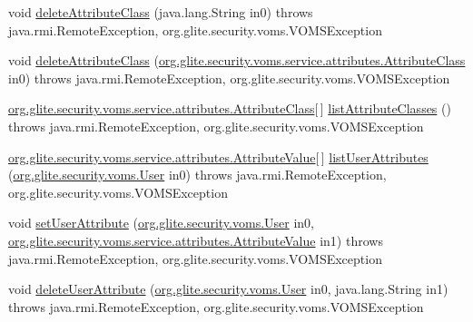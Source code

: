 \begin{DoxyCompactItemize}
\item 
void \hyperlink{classorg_1_1glite_1_1security_1_1voms_1_1service_1_1attributes_1_1VOMSAttributesSoapBindingSkeleton_a7e2d03eb60af98e7e7f45896181dac96}{deleteAttributeClass} (java.lang.String in0)  throws java.rmi.RemoteException, org.glite.security.voms.VOMSException     
\item 
void \hyperlink{classorg_1_1glite_1_1security_1_1voms_1_1service_1_1attributes_1_1VOMSAttributesSoapBindingSkeleton_ac16139dce71cf10dcaf56b9671cf9e37}{deleteAttributeClass} (\hyperlink{classorg_1_1glite_1_1security_1_1voms_1_1service_1_1attributes_1_1AttributeClass}{org.glite.security.voms.service.attributes.AttributeClass} in0)  throws java.rmi.RemoteException, org.glite.security.voms.VOMSException     
\item 
\hyperlink{classorg_1_1glite_1_1security_1_1voms_1_1service_1_1attributes_1_1AttributeClass}{org.glite.security.voms.service.attributes.AttributeClass}\mbox{[}$\,$\mbox{]} \hyperlink{classorg_1_1glite_1_1security_1_1voms_1_1service_1_1attributes_1_1VOMSAttributesSoapBindingSkeleton_a3e032fc86cd41cf0bb3fa929bef306b7}{listAttributeClasses} ()  throws java.rmi.RemoteException, org.glite.security.voms.VOMSException     
\item 
\hyperlink{classorg_1_1glite_1_1security_1_1voms_1_1service_1_1attributes_1_1AttributeValue}{org.glite.security.voms.service.attributes.AttributeValue}\mbox{[}$\,$\mbox{]} \hyperlink{classorg_1_1glite_1_1security_1_1voms_1_1service_1_1attributes_1_1VOMSAttributesSoapBindingSkeleton_a9355e1ed7ea4f837375072417730957c}{listUserAttributes} (\hyperlink{classorg_1_1glite_1_1security_1_1voms_1_1User}{org.glite.security.voms.User} in0)  throws java.rmi.RemoteException, org.glite.security.voms.VOMSException     
\item 
void \hyperlink{classorg_1_1glite_1_1security_1_1voms_1_1service_1_1attributes_1_1VOMSAttributesSoapBindingSkeleton_a3c36b51ff5a1b7f56c3c4fb3ec2e5311}{setUserAttribute} (\hyperlink{classorg_1_1glite_1_1security_1_1voms_1_1User}{org.glite.security.voms.User} in0, \hyperlink{classorg_1_1glite_1_1security_1_1voms_1_1service_1_1attributes_1_1AttributeValue}{org.glite.security.voms.service.attributes.AttributeValue} in1)  throws java.rmi.RemoteException, org.glite.security.voms.VOMSException     
\item 
void \hyperlink{classorg_1_1glite_1_1security_1_1voms_1_1service_1_1attributes_1_1VOMSAttributesSoapBindingSkeleton_a79a76c866aee7cf8ed7660eec54f4045}{deleteUserAttribute} (\hyperlink{classorg_1_1glite_1_1security_1_1voms_1_1User}{org.glite.security.voms.User} in0, java.lang.String in1)  throws java.rmi.RemoteException, org.glite.security.voms.VOMSException     

\end{DoxyCompactItemize}
